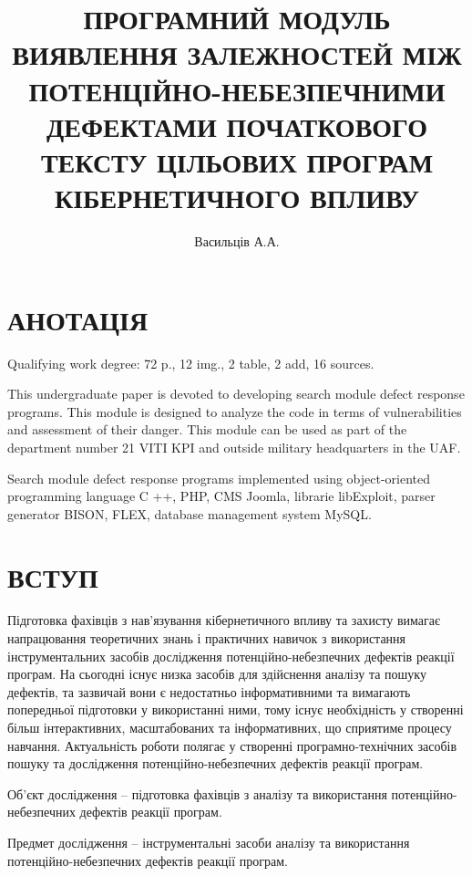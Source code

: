 \documentclass[oneside,final,14pt]{extreport}
\title{ПРОГРАМНИЙ МОДУЛЬ ВИЯВЛЕННЯ ЗАЛЕЖНОСТЕЙ МІЖ ПОТЕНЦІЙНО-НЕБЕЗПЕЧНИМИ ДЕФЕКТАМИ ПОЧАТКОВОГО ТЕКСТУ ЦІЛЬОВИХ ПРОГРАМ КІБЕРНЕТИЧНОГО ВПЛИВУ}
\author{Васильців А.А.}
\begin{document}
\maketitle %

\chapter*{АНОТАЦІЯ}
\label{0annotation:annotation}
Qualifying work degree: 72 p., 12 img., 2 table, 2 add, 16 sources.

This undergraduate paper is devoted to developing search module defect response programs. This module is designed to analyze the code in terms of vulnerabilities and assessment of their danger. This module can be used as part of the department number 21 VITI KPI and outside military headquarters in the UAF.

Search module defect response programs implemented using object-oriented programming language C ++, PHP, CMS Joomla, librarie libExploit, parser generator BISON, FLEX, database management system MySQL.
\pagebreak

\setcounter{tocdepth}{1}
\tableofcontents %
\newpage %
\chapter*{ВСТУП}
\label{1entrance::doc}\label{1entrance:id1}
Підготовка фахівців з нав’язування кібернетичного впливу та захисту вимагає напрацювання теоретичних знань і практичних навичок з використання інструментальних засобів дослідження потенційно-небезпечних дефектів реакції програм. На сьогодні існує низка засобів для здійснення аналізу та пошуку дефектів, та зазвичай вони є недостатньо інформативними та вимагають попередньої підготовки у використанні ними, тому існує необхідність у створенні більш інтерактивних, масштабованих та інформативних, що сприятиме процесу навчання. Актуальність роботи полягає у створенні програмно-технічних засобів пошуку та дослідження потенційно-небезпечних дефектів реакції програм.

Об’єкт дослідження – підготовка фахівців з аналізу та використання потенційно-небезпечних дефектів реакції програм.

Предмет дослідження – інструментальні засоби  аналізу та використання потенційно-небезпечних дефектів реакції програм.
\end{document}
